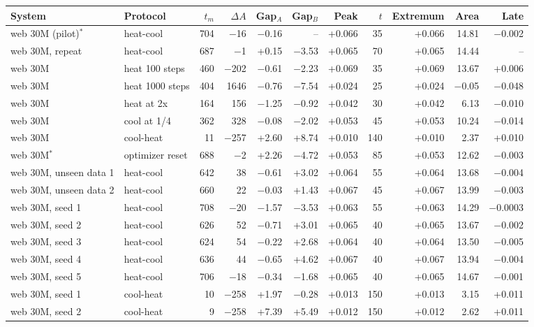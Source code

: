 \begin{tabular}{llrrrrrrrrr}
\toprule
System & Protocol & $t_m$ & $\Delta A$ & Gap$_A$ & Gap$_B$ & Peak & $t$ & Extremum & Area & Late\\
\midrule
web 30M (pilot)$^{*}$ & heat-cool & 704 & $-$16 & $-$0.16 & -- & +0.066 & 35 & +0.066 & 14.81 & $-$0.002\\
web 30M, repeat & heat-cool & 687 & $-$1 & +0.15 & $-$3.53 & +0.065 & 70 & +0.065 & 14.44 & --\\
web 30M & heat 100 steps & 460 & $-$202 & $-$0.61 & $-$2.23 & +0.069 & 35 & +0.069 & 13.67 & +0.006\\
web 30M & heat 1000 steps & 404 & 1646 & $-$0.76 & $-$7.54 & +0.024 & 25 & +0.024 & $-$0.05 & $-$0.048\\
web 30M & heat at 2x & 164 & 156 & $-$1.25 & $-$0.92 & +0.042 & 30 & +0.042 & 6.13 & $-$0.010\\
web 30M & cool at 1/4 & 362 & 328 & $-$0.08 & $-$2.02 & +0.053 & 45 & +0.053 & 10.24 & $-$0.014\\
web 30M & cool-heat & 11 & $-$257 & +2.60 & +8.74 & +0.010 & 140 & +0.010 & 2.37 & +0.010\\
web 30M$^{*}$ & optimizer reset & 688 & $-$2 & +2.26 & $-$4.72 & +0.053 & 85 & +0.053 & 12.62 & $-$0.003\\
web 30M, unseen data 1 & heat-cool & 642 & 38 & $-$0.61 & +3.02 & +0.064 & 55 & +0.064 & 13.68 & $-$0.004\\
web 30M, unseen data 2 & heat-cool & 660 & 22 & $-$0.03 & +1.43 & +0.067 & 45 & +0.067 & 13.99 & $-$0.003\\
web 30M, seed 1 & heat-cool & 708 & $-$20 & $-$1.57 & $-$3.53 & +0.063 & 55 & +0.063 & 14.29 & $-$0.0003\\
web 30M, seed 2 & heat-cool & 626 & 52 & $-$0.71 & +3.01 & +0.065 & 40 & +0.065 & 13.67 & $-$0.002\\
web 30M, seed 3 & heat-cool & 624 & 54 & $-$0.22 & +2.68 & +0.064 & 40 & +0.064 & 13.50 & $-$0.005\\
web 30M, seed 4 & heat-cool & 636 & 44 & $-$0.65 & +4.62 & +0.067 & 40 & +0.067 & 13.94 & $-$0.004\\
web 30M, seed 5 & heat-cool & 706 & $-$18 & $-$0.34 & $-$1.68 & +0.065 & 40 & +0.065 & 14.67 & $-$0.001\\
web 30M, seed 1 & cool-heat & 10 & $-$258 & +1.97 & $-$0.28 & +0.013 & 150 & +0.013 & 3.15 & +0.011\\
web 30M, seed 2 & cool-heat & 9 & $-$258 & +7.39 & +5.49 & +0.012 & 150 & +0.012 & 2.62 & +0.011\\

\end{tabular}
